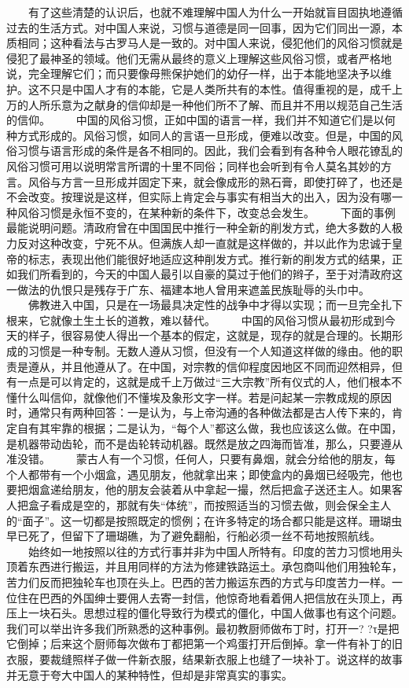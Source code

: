 \documentclass[12pt,oneside]{book}
\begin{document}
\begin{common-format}
　　有了这些清楚的认识后，也就不难理解中国人为什么一开始就盲目固执地遵循过去的生活方式。对中国人来说，习惯与道德是同一回事，因为它们同出一源，本质相同；这种看法与古罗马人是一致的。对中国人来说，侵犯他们的风俗习惯就是侵犯了最神圣的领域。他们无需从最终的意义上理解这些风俗习惯，或者严格地说，完全理解它们；而只要像母熊保护她们的幼仔一样，出于本能地坚决予以维护。这不只是中国人才有的本能，它是人类所共有的本性。值得重视的是，成千上万的人所乐意为之献身的信仰却是一种他们所不了解、而且并不用以规范自己生活的信仰。 
　　中国的风俗习惯，正如中国的语言一样，我们并不知道它们是以何种方式形成的。风俗习惯，如同人的言语一旦形成，便难以改变。但是，中国的风俗习惯与语言形成的条件是各不相同的。因此，我们会看到有各种令人眼花镣乱的风俗习惯可用以说明常言所谓的十里不同俗；同样也会听到有令人莫名其妙的方言。风俗与方言一旦形成并固定下来，就会像成形的熟石膏，即使打碎了，也还是不会改变。按理说是这样，但实际上肯定会与事实有相当大的出入，因为没有哪一种风俗习惯是永恒不变的，在某种新的条件下，改变总会发生。 
　　下面的事例最能说明问题。清政府曾在中国国民中推行一种全新的削发方式，绝大多数的人极力反对这种改变，宁死不从。但满族人却一直就是这样做的，并以此作为忠诚于皇帝的标志，表现出他们能很好地适应这种削发方式。推行新的削发方式的结果，正如我们所看到的，今天的中国人最引以自豪的莫过于他们的辫子，至于对清政府这一做法的仇恨只是残存于广东、福建本地人曾用来遮盖民族耻辱的头巾中。 
　　佛教进入中国，只是在一场最具决定性的战争中才得以实现；而一旦完全扎下根来，它就像土生土长的道教，难以替代。 
　　中国的风俗习惯从最初形成到今天的样子，很容易使人得出一个基本的假定，这就是，现存的就是合理的。长期形成的习惯是一种专制。无数人遵从习惯，但没有一个人知道这样做的缘由。他的职责是遵从，并且他遵从了。在中国，对宗教的信仰程度因地区不同而迎然相异，但有一点是可以肯定的，这就是成千上万做过“三大宗教”所有仪式的人，他们根本不懂什么叫信仰，就像他们不懂埃及象形文字一样。若是问起某一宗教成规的原因时，通常只有两种回答：一是认为，与上帝沟通的各种做法都是古人传下来的，肯定自有其牢靠的根据；二是认为，“每个人”都这么做，我也应该这么做。在中国，是机器带动齿轮，而不是齿轮转动机器。既然是放之四海而皆准，那么，只要遵从准没错。 
　　蒙古人有一个习惯，任何人，只要有鼻烟，就会分给他的朋友，每个人都带有一个小烟盒，遇见朋友，他就拿出来；即使盒内的鼻烟已经吸完，他也要把烟盒递给朋友，他的朋友会装着从中拿起一撮，然后把盒子送还主人。如果客人把盒子看成是空的，那就有失“体统”，而按照适当的习惯去做，则会保全主人的“面子”。这一切都是按照既定的惯例；在许多特定的场合都只能是这样。珊瑚虫早已死了，但留下了珊瑚礁，为了避免翻船，行船必须一丝不苟地按照航线。 
　　始终如一地按照以往的方式行事并非为中国人所特有。印度的苦力习惯地用头顶着东西进行搬运，并且用同样的方法为修建铁路运土。承包商叫他们用独轮车，苦力们反而把独轮车也顶在头上。巴西的苦力搬运东西的方式与印度苦力一样。一位住在巴西的外国绅士要佣人去寄一封信，他惊奇地看着佣人把信放在头顶上，再压上一块石头。思想过程的僵化导致行为模式的僵化，中国人做事也有这个问题。我们可以举出许多我们所熟悉的这种事例。最初教厨师做布丁时，打开一? ?τ是把它倒掉；后来这个厨师每次做布丁都把第一个鸡蛋打开后倒掉。拿一件有补丁的旧衣服，要裁缝照样子做一件新衣服，结果新衣服上也缝了一块补丁。说这样的故事并无意于夸大中国人的某种特性，但却是非常真实的事实。 

\end{common-format}
\end{document}
